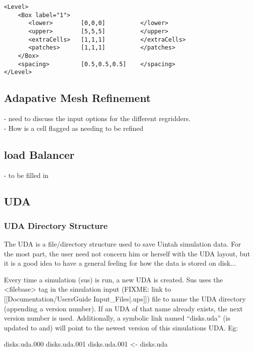 \begin{Verbatim}[fontsize=\footnotesize]
<Level>
    <Box label="1">
       <lower>        [0,0,0]          </lower>
       <upper>        [5,5,5]          </upper>
       <extraCells>   [1,1,1]          </extraCells>
       <patches>      [1,1,1]          </patches>
    </Box>
    <spacing>         [0.5,0.5,0.5]    </spacing>
</Level>
 \end{Verbatim}
%
\subsection{Adapative Mesh Refinement}
- need to discuss the input options for the different regridders.\\
- How is a cell flagged as needing to be refined
%
\subsection{load Balancer}
- to be filled in

\subsection{UDA}

\subsubsection{UDA Directory Structure}

The UDA is a file/directory structure used to save Uintah simulation
data.  For the most part, the user need not concern him or herself
with the UDA layout, but it is a good idea to have a general feeling
for how the data is stored on disk...


Every time a simulation (sus) is run, a new UDA is created.  Sus uses
the <filebase> tag in the simulation input
(FIXME: link to [[Documentation/UsersGuide Input\_Files|.ups]]) file to name the UDA
directory (appending a version number).  If an UDA of that name
already exists, the next version number is used.  Additionally, a
symbolic link named ``disks.uda'' (is updated to and) will point to
the newest version of this simulations UDA.  Eg:

disks.uda.000
disks.uda.001
disks.uda.001 <- disks.uda


